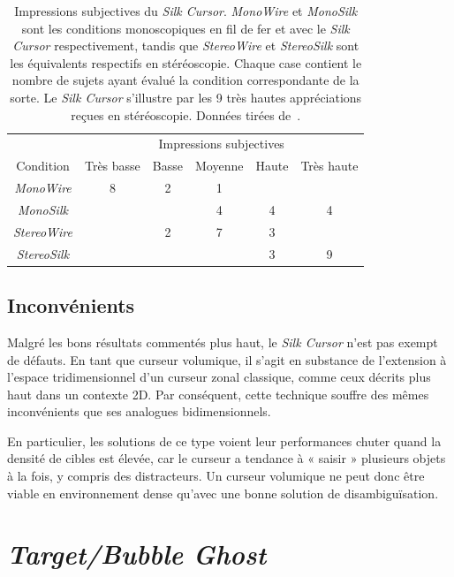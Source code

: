 	\begin{table}
	\centering
	\begin{tabular}{c | c c c c c}
							& \multicolumn{5}{c}{Impressions subjectives} \\
		Condition			& Très basse	& Basse	& Moyenne	& Haute	& Très haute \bigstrut[b] \\ \hline
		\emph{MonoWire}		& 8				& 2		& 1			&		& \bigstrut[t]	\\
		\emph{MonoSilk}		& 				& 		& 4			& 4		& 4 			\\
		\emph{StereoWire}	& 				& 2		& 7			& 3		& 	 			\\
		\emph{StereoSilk}	& 				& 		& 			& 3		& 9 			\\
	\end{tabular}
	\caption[\emph{Silk Cursor} --- impressions subjectives]{Impressions subjectives du \emph{Silk Cursor}. \emph{MonoWire} et \emph{MonoSilk} sont les conditions monoscopiques en fil de fer et avec le \emph{Silk Cursor} respectivement, tandis que \emph{StereoWire} et \emph{StereoSilk} sont les équivalents respectifs en stéréoscopie. Chaque case contient le nombre de sujets ayant évalué la condition correspondante de la sorte. Le \emph{Silk Cursor} s'illustre par les 9 très hautes appréciations reçues en stéréoscopie. Données tirées de~\cite{zhai1994silk}.}
	\label{tab:silkImpr}
	\end{table}
	
	\subsection{Inconvénients}
	Malgré les bons résultats commentés plus haut, le \emph{Silk Cursor} n'est pas exempt de défauts. En tant que curseur volumique, il s'agit en substance de l'extension à l'espace tridimensionnel d'un curseur zonal classique, comme ceux décrits plus haut dans un contexte 2D. Par conséquent, cette technique souffre des mêmes inconvénients que ses analogues bidimensionnels.
	
	En particulier, les solutions de ce type voient leur performances chuter quand la densité de cibles est élevée, car le curseur a tendance à « saisir » plusieurs objets à la fois, y compris des distracteurs. Un curseur volumique ne peut donc être viable en environnement dense qu'avec une bonne solution de disambiguïsation.
	
\section{\emph{Target/Bubble Ghost}}
